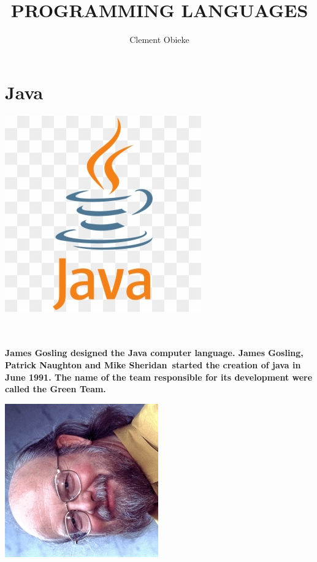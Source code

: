\documentclass[[12pt]{article}
\title{PROGRAMMING LANGUAGES}
\author{Clement Obieke}
\begin{document}
	\maketitle
	\newpage
	\section* {\Huge{Java}}	
		\includegraphics[width= 0.1\linewidth]{pics/Jicon.png} \raggedright\\
		\begin{minipage}{0.59\linewidth}		
			\paragraph{}
			\textbf{\large James Gosling designed the Java computer language. James Gosling, Patrick Naughton and Mike Sheridan started the creation of java in June 1991. The name of the team responsible for its development  were called the Green Team.}					
		\end{minipage}
		\begin{minipage}{0.39\linewidth}
			\includegraphics[width= \linewidth]{pics/James.jpg}
		\end{minipage}
\end{document}
